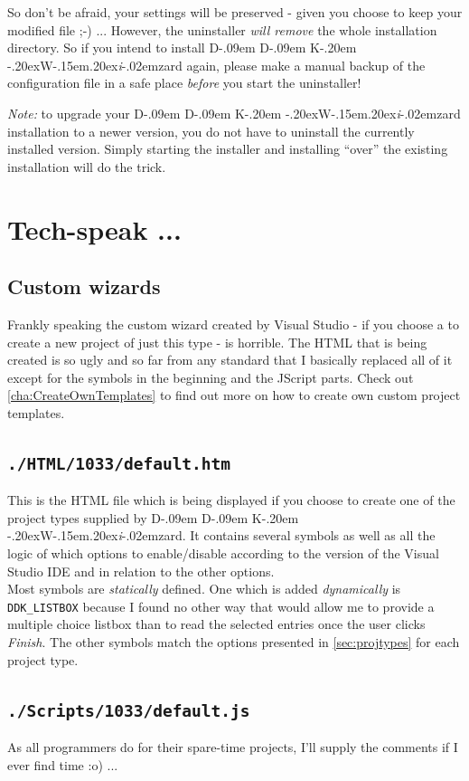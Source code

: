 \documentclass[a4paper,titlepage]{report}
\def\ddkwiz{D\kern-.09em D\kern-.09em K\kern-.20em \raise-.20ex\hbox{W}\kern-.15em\raise.20ex\hbox{\it{i}}\kern-.02em{zard}}
\begin{document}
So don't be afraid, your settings will be preserved - given you choose to keep your
modified file \textsf{;-)} ... However, the uninstaller \emph{will remove} the whole installation
directory. So if you intend to install \ddkwiz{} again, please make a manual backup of the
configuration file in a safe place \emph{before} you start the uninstaller!

\emph{Note:} to upgrade your \ddkwiz{} installation to a newer version, you do
not have to uninstall the currently installed version. Simply starting the installer
and installing ``over'' the existing installation will do the trick.

\chapter{Tech-speak ...}\thispagestyle{fancy}
\section{Custom wizards}
Frankly speaking the custom wizard created by Visual Studio - if you choose a to create
a new project of just this type - is horrible. The HTML that is being created is so
ugly and so far from any standard that I basically replaced all of it except for the
symbols in the beginning and the JScript parts. Check out \autoref{cha:CreateOwnTemplates}
to find out more on how to create own custom project templates.

\section{\texttt{./HTML/1033/default.htm}}
This is the HTML file which is being displayed if you choose to create one of
the project types supplied by \ddkwiz{}. It contains several symbols as well as
all the logic of which options to enable/disable according to the version of the
Visual Studio IDE and in relation to the other options.\\

Most symbols are \emph{statically} defined. One which is added
\emph{dynamically} is \verb+DDK_LISTBOX+ because I found no other way that
would allow me to provide a multiple choice listbox than to read the selected
entries once the user clicks \emph{Finish}. The other symbols match
the options presented in \autoref{sec:projtypes} for each project type.

\section{\texttt{./Scripts/1033/default.js}}
As all programmers do for their spare-time projects, I'll supply the comments
if I ever find time \textsf{:o)} ...\\
\end{document}
